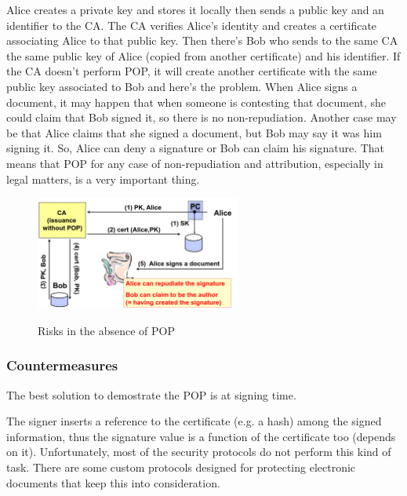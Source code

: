 Alice creates a private key and stores it locally then sends a public
key and an identifier to the CA. The CA verifies Alice’s identity and
creates a certificate associating Alice to that public key. Then
there’s Bob who sends to the same CA the same public key of Alice
(copied from another certificate) and his identifier. If the CA
doesn’t perform POP, it will create another certificate with the same
public key associated to Bob and here’s the problem. When Alice signs
a document, it may happen that when someone is contesting that
document, she could claim that Bob signed it, so there is no
non-repudiation. Another case may be that Alice claims that she signed
a document, but Bob may say it was him signing it. So, Alice can deny
a signature or Bob can claim his signature. That means that POP for
any case of non-repudiation and attribution, especially in legal
matters, is a very important thing.

\begin{figure}[H]
  \centering
  \includegraphics[width=0.6\textwidth]{img/x509 pop absence.png}
  \label{fig:risks in the absence of POP}

  \caption{Risks in the absence of POP}
\end{figure}
\subsubsection{Countermeasures}
\begin{boxH}
  The best solution to demostrate the POP is at signing time.
\end{boxH}
The signer inserts a reference to the certificate (e.g. a hash) among
the signed information, thus the signature value is a function of the
certificate too (depends on it).
Unfortunately, most of the security protocols do not perform this kind
of task. There are some custom protocols designed for protecting
electronic documents that keep this into consideration.\\

